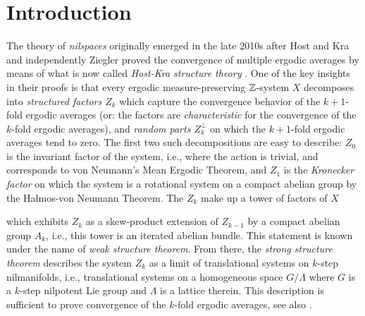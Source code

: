 
\begin{abstract}
Originating in ergodic structure theory, nilspace theory is concerned with the study of cubical spaces.
A first key result in this theory, the \emph{weak structure theorem}, is the representation of a concrete fibrant compact cubespace as
a tower of its canonical truncations, exhibiting each step over the previous one as a principal bundle by a compact abelian group.
We present a categorical proof of the weak structure theorem by systematically interpreting the relevant concepts in an appropriate context.


\end{abstract}

\tableofcontents
\clearpage

\section{Introduction}

The theory of \emph{nilspaces} originally emerged in the late 2010s after Host and Kra and independently Ziegler proved the convergence of multiple ergodic averages \cite{Host2005,Ziegler2006} by means of what is now called \emph{Host-Kra structure theory} \cite{Host2018,Eisner2025}.
One of the key insights in their proofs is that every ergodic measure-preserving $\mathbb{Z}$-system $X$
decomposes into \emph{structured factors $Z_k$} which capture the convergence behavior of the $k+1$-fold ergodic averages (or: the factors are \emph{characteristic} for the convergence of the $k$-fold ergodic averages),
and \emph{random parts $Z_k^\perp$} on which the $k+1$-fold ergodic averages tend to zero.
The first two such decompositions are easy to describe:
$Z_0$ is the invariant factor of the system, i.e., where the action is trivial,
and corresponds to von Neumann's Mean Ergodic Theorem,
and $Z_1$ is the \emph{Kronecker factor} on which the system is a rotational system on a compact abelian group by the Halmos-von Neumann Theorem.
The $Z_k$ make up a tower of factors of $X$
\begin{center}
\end{center}
which exhibits $Z_k$ as a skew-product extension of $Z_{k-1}$ by a compact abelian group $A_k$,
i.e., this tower is an iterated abelian bundle.
This statement is known under the name of \emph{weak structure theorem}.
From there, the \emph{strong structure theorem} describes the system $Z_k$ as a limit of translational systems on $k$-step nilmanifolds,
i.e., translational systems on a homogeneous space $G/\Lambda$ where $G$ is a $k$-step nilpotent Lie group and $\Lambda$ is a lattice therein.
This description is sufficient to prove convergence of the $k$-fold ergodic averages,
see also \cite{Leibman2006}.

